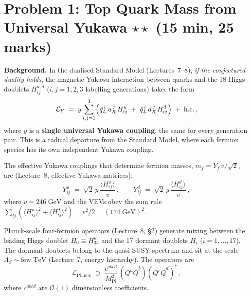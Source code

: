 \documentclass[11pt,a4paper]{article}
\begin{document}
\section*{Problem 1: Top Quark Mass from Universal Yukawa
  \hfill $\star\star$ \normalsize(15 min, 25 marks)}
\label{prob:top-mass}

\noindent\textbf{Background.}
In the dualised Standard Model (Lectures~7--8), \emph{if the conjectured
duality holds}, the magnetic Yukawa interaction between quarks and the
18 Higgs doublets $H_{ij}^{u,d}$ ($i,j = 1,2,3$ labelling generations)
takes the form
\begin{equation}\label{eq:yukawa-universal}
  \mathcal{L}_Y
  \;=\; y \sum_{i,j=1}^{3}
  \Bigl(
    \bar{q}_L^{\,i}\, u_R^{\,j}\, H_{ij}^u
    \;+\;
    \bar{q}_L^{\,i}\, d_R^{\,j}\, H_{ij}^d
  \Bigr)
  \;+\; \text{h.c.}\,,
\end{equation}
where $y$ is a \textbf{single universal Yukawa coupling}, the same for
every generation pair.  This is a radical departure from the Standard
Model, where each fermion species has its own independent Yukawa
coupling.

The effective Yukawa couplings that determine fermion masses,
$m_f = Y_f\,v/\sqrt{2}$, are (Lecture~8, effective Yukawa matrices):
\begin{equation}\label{eq:eff-yukawa}
  Y_{ij}^u \;=\; \sqrt{2}\,y\, \frac{\langle H_{ij}^u \rangle}{v}\,,
  \qquad
  Y_{ij}^d \;=\; \sqrt{2}\,y\, \frac{\langle H_{ij}^d \rangle}{v}\,,
\end{equation}
where $v = 246\;\text{GeV}$ and the VEVs obey the sum rule
$\sum_{ij}(\langle H_{ij}^u\rangle^2
+ \langle H_{ij}^d\rangle^2) = v^2/2 = (174\;\text{GeV})^2$.

Planck-scale four-fermion operators (Lecture~8, \S2) generate mixing
between the leading Higgs doublet $H_0 \equiv H_{33}^u$ and the 17
dormant doublets $H_i$ ($i = 1, \ldots, 17$).  The dormant doublets
belong to the quasi-SUSY spectrum and sit at the scale
$\Lambda_S \sim \text{few TeV}$ (Lecture~7, energy hierarchy).  The
operators are
\begin{equation}\label{eq:planck-op}
  \mathcal{L}_{\text{Planck}}
  \;\supset\;
  \frac{c^{abcd}}{M_{\text{Pl}}^2}\,
  (Q^a \widetilde{Q}^b)(Q^c \widetilde{Q}^d)^\dagger\,,
\end{equation}
where $c^{abcd}$ are $\mathcal{O}(1)$ dimensionless coefficients.

\medskip
\end{document}
